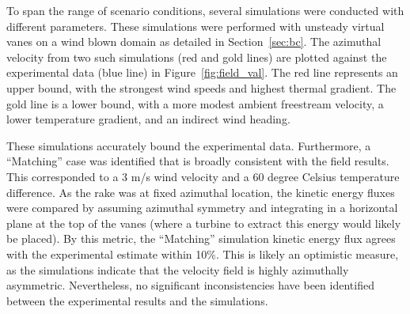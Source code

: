 To span the range of scenario conditions, several simulations were conducted
with different parameters. These simulations were performed with
unsteady virtual vanes on a wind blown domain as detailed in
Section~\ref{sec:bc}.  The azimuthal velocity from two such
simulations (red and gold lines) are plotted against the experimental
data (blue line) in Figure~\ref{fig:field_val}. The red line represents
an upper bound, with the strongest wind speeds and highest thermal
gradient. The gold line is a lower bound, with a more modest ambient
freestream velocity, a lower temperature gradient, and an indirect wind
heading. 

These simulations accurately bound the experimental data. Furthermore, a
``Matching'' case was identified that is broadly consistent with the
field results. This corresponded to a 3 m/s wind velocity and a 60
degree Celsius temperature difference. 
As the rake was at fixed azimuthal location, the kinetic energy fluxes were
compared by assuming azimuthal symmetry and integrating in a horizontal
plane at the top of the vanes (where a turbine to extract this energy
would likely be placed). By this metric, the ``Matching'' simulation
kinetic energy flux agrees with the experimental estimate within
10\%. This is likely an optimistic measure, as the simulations indicate
that the velocity field is highly azimuthally asymmetric. Nevertheless,
no significant inconsistencies have been identified between the
experimental results and the simulations. 

%
% 
%
% 
%
%
%
%
